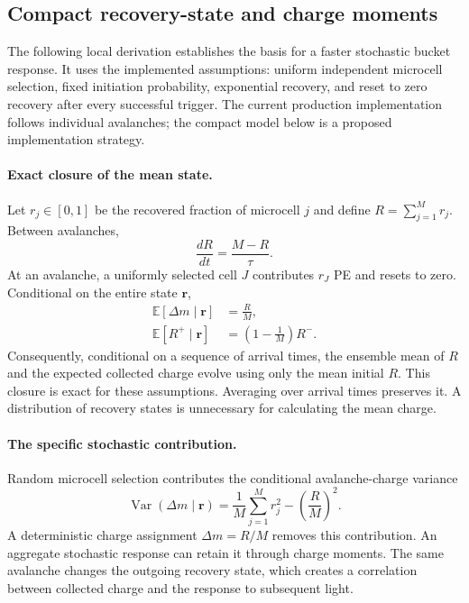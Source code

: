 \documentclass[11pt]{article}
\newcommand{\E}{\mathbb{E}}
\newcommand{\Var}{\operatorname{Var}}
\begin{document}
\subsection{Compact recovery-state and charge moments}
\label{sec:compact-recovery}
The following local derivation establishes the basis for a faster stochastic
bucket response. It uses the implemented assumptions: uniform independent
microcell selection, fixed initiation probability, exponential recovery, and
reset to zero recovery after every successful trigger. The current production
implementation follows individual avalanches; the compact model below is a
proposed implementation strategy.

\paragraph{Exact closure of the mean state.}
Let $r_j\in[0,1]$ be the recovered fraction of microcell $j$ and define
$R=\sum_{j=1}^M r_j$. Between avalanches,
\begin{equation}
 \frac{dR}{dt}=\frac{M-R}{\tau}.
 \label{eq:total-recovery-drift}
\end{equation}
At an avalanche, a uniformly selected cell $J$ contributes $r_J$ PE and
resets to zero. Conditional on the entire state $\boldsymbol r$,
\begin{align}
 \E[\Delta m\mid\boldsymbol r]&=\frac{R}{M},\\
 \E[R^+\mid\boldsymbol r]&=\left(1-\frac1M\right)R^-.
 \label{eq:mean-state-jump}
\end{align}
Consequently, conditional on a sequence of arrival times, the ensemble mean
of $R$ and the expected collected charge evolve using only the mean initial
$R$. This closure is exact for these assumptions. Averaging over arrival
times preserves it. A distribution of recovery states is unnecessary for
calculating the mean charge.

\paragraph{The specific stochastic contribution.}
Random microcell selection contributes the conditional avalanche-charge
variance
\begin{equation}
 \Var(\Delta m\mid\boldsymbol r)
 =\frac1M\sum_{j=1}^M r_j^2-\left(\frac{R}{M}\right)^2.
 \label{eq:cell-choice-variance}
\end{equation}
A deterministic charge assignment $\Delta m=R/M$ removes this contribution.
An aggregate stochastic response can retain it through charge moments.
The same avalanche changes the outgoing recovery state, which creates a
correlation between collected charge and the response to subsequent light.
\end{document}
